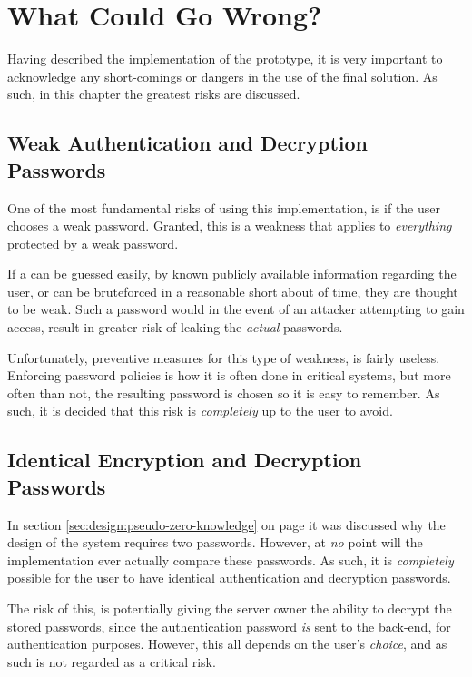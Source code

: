\chapter{What Could Go Wrong?}
	Having described the implementation of the prototype, it is very important to acknowledge any short-comings or dangers in the use of the final solution. As such, in this chapter the greatest risks are discussed.
	

	\section{Weak Authentication and Decryption Passwords}
		One of the most fundamental risks of using this implementation, is if the user chooses a weak password. Granted, this is a weakness that applies to \emph{everything} protected by a weak password.

		If a can be guessed easily, by known publicly available information regarding the user, or can be bruteforced in a reasonable short about of time, they are thought to be weak. Such a password would in the event of an attacker attempting to gain access, result in greater risk of leaking the \emph{actual} passwords.

		Unfortunately, preventive measures for this type of weakness, is fairly useless. Enforcing password policies is how it is often done in critical systems, but more often than not, the resulting password is chosen so it is easy to remember. As such, it is decided that this risk is \emph{completely} up to the user to avoid.

	\section{Identical Encryption and Decryption Passwords}
		In section \ref{sec:design:pseudo-zero-knowledge} on page \pageref{sec:design:pseudo-zero-knowledge} it was discussed why the design of the system requires two passwords. However, at \emph{no} point will the implementation ever actually compare these passwords. As such, it is \emph{completely} possible for the user to have identical authentication and decryption passwords.

		The risk of this, is potentially giving the server owner the ability to decrypt the stored passwords, since the authentication password \emph{is} sent to the back-end, for authentication purposes. However, this all depends on the user's \emph{choice}, and as such is not regarded as a critical risk.
	
